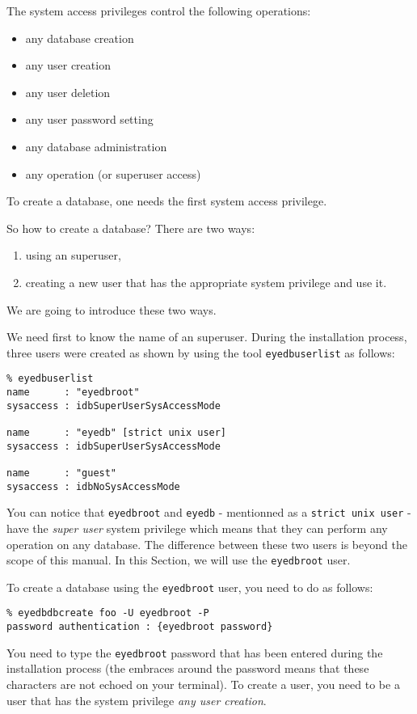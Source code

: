 The system access privileges control the following operations: 
\begin{itemize}
\item any database creation 
\item any user creation 
\item any user deletion 
\item any user password setting 
\item any database administration 
\item any operation (or superuser access) 
\end{itemize}

To create a database, one needs the first system access privilege.


So how to create a database?
There are two ways:
\begin{enumerate}
\item using an \eyedb superuser, 
\item creating a new user that has the appropriate system privilege and use it.
\end{enumerate}


We are going to introduce these two ways.

We need first to know the name of an \eyedb superuser. During the installation
process, three \eyedb users were created as shown by using the tool
\texttt{eyedbuserlist} as follows:
\verbsize
\begin{verbatim}
% eyedbuserlist
name      : "eyedbroot"
sysaccess : idbSuperUserSysAccessMode
 
name      : "eyedb" [strict unix user]
sysaccess : idbSuperUserSysAccessMode

name      : "guest"
sysaccess : idbNoSysAccessMode
\end{verbatim}
\normalsize
You can notice that \texttt{eyedbroot} and \texttt{eyedb}
- mentionned as a \texttt{strict unix user} - have
the \emph{super user} system privilege which means that they can perform
any operation on any database. The difference between these two users
is beyond the scope of this manual. In this Section, we will use 
the \texttt{eyedbroot} user.


To create a database using the \texttt{eyedbroot} user, you need to do
as follows:
\verbsize
\begin{verbatim}
% eyedbdbcreate foo -U eyedbroot -P
password authentication : {eyedbroot password}
\end{verbatim}
\normalsize
You need to type the \texttt{eyedbroot} password that has been entered
during the installation process (the embraces around the password means that
these characters are not echoed on your terminal).
To create a user, you need to be a user that has the system privilege
\emph{any user creation}.

